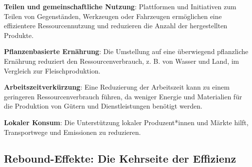 \documentclass[
  nswissgerman,
  a4paper,
  openany]{book}
\begin{document}
\begin{tcolorbox}[enhanced jigsaw, arc=.35mm, bottomrule=.15mm, bottomtitle=1mm, breakable, colback=white, colbacktitle=quarto-callout-tip-color!10!white, colframe=quarto-callout-tip-color-frame, coltitle=black, left=2mm, leftrule=.75mm, opacityback=0, opacitybacktitle=0.6, rightrule=.15mm, title={Suffizienzstrategien in der Praxis: Beispiele}, titlerule=0mm, toprule=.15mm, toptitle=1mm]

\textbf{Teilen und gemeinschaftliche Nutzung}: Plattformen und
Initiativen zum Teilen von Gegenständen, Werkzeugen oder Fahrzeugen
ermöglichen eine effizientere Ressourcennutzung und reduzieren die
Anzahl der hergestellten Produkte.

\textbf{Pflanzenbasierte Ernährung}: Die Umstellung auf eine überwiegend
pflanzliche Ernährung reduziert den Ressourcenverbrauch, z. B. von
Wasser und Land, im Vergleich zur Fleischproduktion.

\textbf{Arbeitszeitverkürzung}: Eine Reduzierung der Arbeitszeit kann zu
einem geringeren Ressourcenverbrauch führen, da weniger Energie und
Materialien für die Produktion von Gütern und Dienstleistungen benötigt
werden.

\textbf{Lokaler Konsum}: Die Unterstützung lokaler Produzent*innen und
Märkte hilft, Transportwege und Emissionen zu reduzieren.

\end{tcolorbox}

\subsection{Rebound-Effekte: Die Kehrseite der
Effizienz}\label{rebound-effekte-die-kehrseite-der-effizienz}
\end{document}
